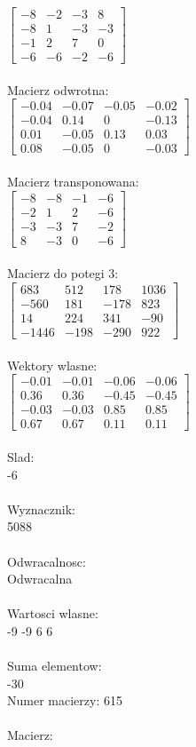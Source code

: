 \documentclass[a4paper,12pt]{article}
\begin{document}
$\begin{bmatrix} -8&-2&-3&8\\-8&1&-3&-3\\-1&2&7&0\\-6&-6&-2&-6 \end{bmatrix}$
\\
\\
Macierz odwrotna:\\

$\begin{bmatrix} -0.04&-0.07&-0.05&-0.02\\-0.04&0.14&0&-0.13\\0.01&-0.05&0.13&0.03\\0.08&-0.05&0&-0.03 \end{bmatrix}$
\\
\\
Macierz transponowana:\\

$\begin{bmatrix} -8&-8&-1&-6\\-2&1&2&-6\\-3&-3&7&-2\\8&-3&0&-6 \end{bmatrix}$
\\
\\
Macierz do potegi 3:\\

$\begin{bmatrix} 683&512&178&1036\\-560&181&-178&823\\14&224&341&-90\\-1446&-198&-290&922 \end{bmatrix}$
\\
\\
Wektory wlasne:\\

$\begin{bmatrix} -0.01&-0.01&-0.06&-0.06\\0.36&0.36&-0.45&-0.45\\-0.03&-0.03&0.85&0.85\\0.67&0.67&0.11&0.11 \end{bmatrix}$
\\
\\
Slad:\\
-6
\\
\\
Wyznacznik:\\
5088
\\
\\
Odwracalnosc:\\
Odwracalna
\\
\\
Wartosci wlasne:\\
-9 -9 6 6
\\
\\
Suma elementow:\\
-30
\\
\newpage
Numer macierzy:
615
\\
\\
Macierz:\\
\end{document}
